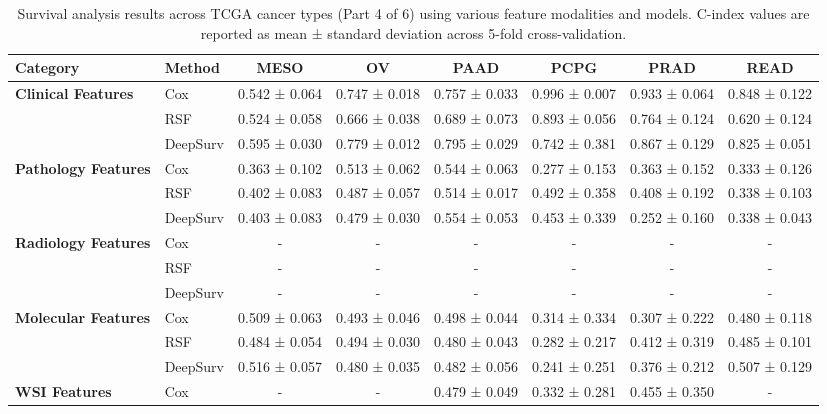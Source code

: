 \begin{sidewaystable}[htbp]
    \centering
    \caption{Survival analysis results across TCGA cancer types (Part 4 of 6) using various feature modalities and models. C-index values are reported as mean ± standard deviation across 5-fold cross-validation.}
    \label{tab:survival_results_4}
    \begin{tabular}{@{}llcccccc@{}}
        \toprule
        \textbf{Category} & \textbf{Method} & \textbf{MESO} & \textbf{OV} & \textbf{PAAD} & \textbf{PCPG} & \textbf{PRAD} & \textbf{READ} \\
        \midrule
        \multirow{3}{*}{\textbf{Clinical Features}} & Cox & 0.542 ± 0.064 & 0.747 ± 0.018 & 0.757 ± 0.033 & 0.996 ± 0.007 & 0.933 ± 0.064 & 0.848 ± 0.122 \\
        & RSF & 0.524 ± 0.058 & 0.666 ± 0.038 & 0.689 ± 0.073 & 0.893 ± 0.056 & 0.764 ± 0.124 & 0.620 ± 0.124 \\
        & DeepSurv & 0.595 ± 0.030 & 0.779 ± 0.012 & 0.795 ± 0.029 & 0.742 ± 0.381 & 0.867 ± 0.129 & 0.825 ± 0.051 \\
        \midrule
        \multirow{3}{*}{\textbf{Pathology Features}} & Cox & 0.363 ± 0.102 & 0.513 ± 0.062 & 0.544 ± 0.063 & 0.277 ± 0.153 & 0.363 ± 0.152 & 0.333 ± 0.126 \\
        & RSF & 0.402 ± 0.083 & 0.487 ± 0.057 & 0.514 ± 0.017 & 0.492 ± 0.358 & 0.408 ± 0.192 & 0.338 ± 0.103 \\
        & DeepSurv & 0.403 ± 0.083 & 0.479 ± 0.030 & 0.554 ± 0.053 & 0.453 ± 0.339 & 0.252 ± 0.160 & 0.338 ± 0.043 \\
        \midrule
        \multirow{3}{*}{\textbf{Radiology Features}} & Cox & - & - & - & - & - & - \\
        & RSF & - & - & - & - & - & - \\
        & DeepSurv & - & - & - & - & - & - \\
        \midrule
        \multirow{3}{*}{\textbf{Molecular Features}} & Cox & 0.509 ± 0.063 & 0.493 ± 0.046 & 0.498 ± 0.044 & 0.314 ± 0.334 & 0.307 ± 0.222 & 0.480 ± 0.118 \\
        & RSF & 0.484 ± 0.054 & 0.494 ± 0.030 & 0.480 ± 0.043 & 0.282 ± 0.217 & 0.412 ± 0.319 & 0.485 ± 0.101 \\
        & DeepSurv & 0.516 ± 0.057 & 0.480 ± 0.035 & 0.482 ± 0.056 & 0.241 ± 0.251 & 0.376 ± 0.212 & 0.507 ± 0.129 \\
        \midrule
        \multirow{3}{*}{\textbf{WSI Features}} & Cox & - & - & 0.479 ± 0.049 & 0.332 ± 0.281 & 0.455 ± 0.350 & - \\

\end{tabular}
\end{sidewaystable}
